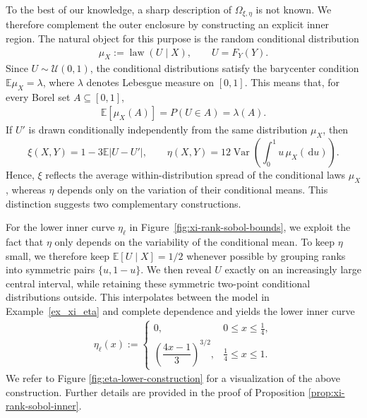 \documentclass{article}
\newcommand{\de}{\mathrm{\,d}}
\newcommand{\lam}{\lambda}
\newcommand{\Var}{\operatorname{Var}}
\newcommand{\E}{\mathbb{E}}
\newcommand{\cU}{\mathcal{U}}
\begin{document}
To the best of our knowledge, a sharp description of \(\Omega_{\xi,\eta}\) is not known.
We therefore complement the outer enclosure by constructing an explicit inner region.
The natural object for this purpose is the random conditional distribution
\begin{align*}
    \mu_X:=\operatorname{law}(U\mid X),
    \qquad
    U=F_Y(Y).
\end{align*}
Since \(U\sim\cU(0,1)\), the conditional distributions satisfy the barycenter condition \(\E\mu_X=\lam\), where \(\lam\) denotes Lebesgue measure on \([0,1]\).
This means that, for every Borel set \(A\subseteq[0,1]\),
\begin{align*}
    \E[\mu_X(A)]
    =
    P(U\in A)
    =
    \lam(A).
\end{align*} If \(U'\) is
drawn conditionally independently from the same distribution \(\mu_X\), then
\begin{equation}\label{eq:ciid-coordinates}
    \xi(X,Y)
    =
    1-3\E|U-U'|,
    \qquad
    \eta(X,Y)
    =
    12\Var\left(\int_0^1u\,\mu_X(\de u)\right).
\end{equation}
Hence, \(\xi\) reflects the average within-distribution spread of the conditional laws \(\mu_X\), whereas \(\eta\) depends only on the variation of their conditional means.
This distinction suggests two complementary constructions.

For the lower inner curve \(\eta_\ell\) in Figure~\ref{fig:xi-rank-sobol-bounds}, we exploit the fact that \(\eta\) only depends on the variability of the conditional mean.
To keep \(\eta\) small, we therefore keep \(\E[U\mid X]=1/2\) whenever possible by grouping ranks into symmetric pairs \(\{u,1-u\}\).
We then reveal \(U\) exactly on an increasingly large central interval, while retaining these symmetric two-point conditional distributions outside.
This interpolates between the model in Example~\ref{ex_xi_eta} and complete dependence and yields the lower inner curve
\begin{align}\label{def_eta_ell}
    \eta_\ell(x)
    :=
    \begin{cases}
        0, & 0\leq x\leq\frac14,\\[2mm]
        \left(\dfrac{4x-1}{3}\right)^{3/2},
            & \frac14\leq x\leq1.
    \end{cases}
\end{align}
We refer to Figure \ref{fig:eta-lower-construction} for a visualization of the above construction.
Further details are provided in the proof of Proposition \ref{prop:xi-rank-sobol-inner}.
\end{document}
